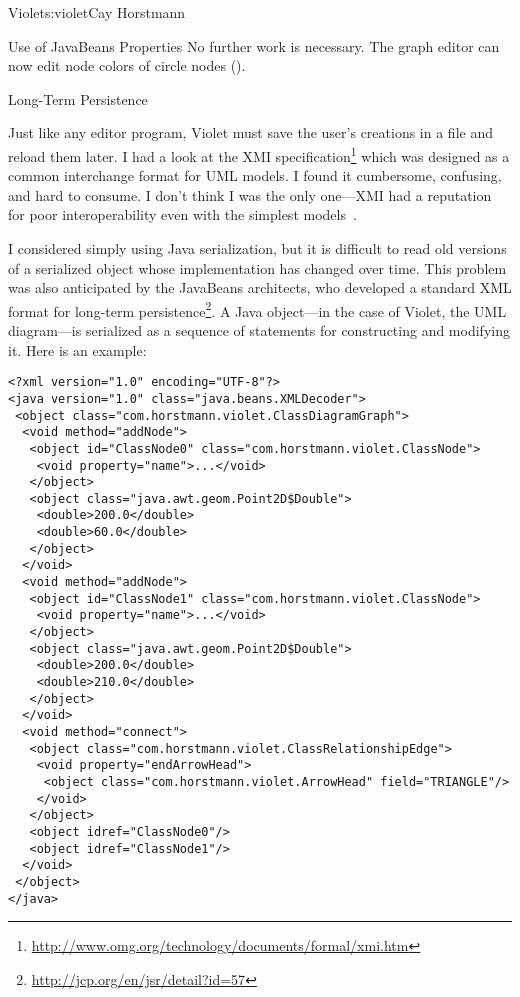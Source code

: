 \begin{aosachapter}{Violet}{s:violet}{Cay Horstmann}
\begin{aosasect1}{Use of JavaBeans Properties}
\noindent No further work is necessary. The graph editor can now edit node
colors of circle nodes ().


\end{aosasect1}

\begin{aosasect1}{Long-Term Persistence}

Just like any editor program, Violet must save the user's creations in
a file and reload them later. I had a look at the XMI
specification\footnote{\url{http://www.omg.org/technology/documents/formal/xmi.htm}}
which was designed as a common interchange format for UML models. I
found it cumbersome, confusing, and hard to consume. I don't think I
was the only one---XMI had a reputation for poor interoperability even
with the simplest models~\cite{bib:persson:osstools}.

I considered simply using Java serialization, but it is difficult to
read old versions of a serialized object whose implementation has
changed over time.  This problem was also anticipated by the JavaBeans
architects, who developed a standard XML format for long-term
persistence\footnote{\url{http://jcp.org/en/jsr/detail?id=57}}.  A
Java object---in the case of Violet, the UML diagram---is serialized
as a sequence of statements for constructing and modifying it. Here is
an example:

\begin{verbatim}
<?xml version="1.0" encoding="UTF-8"?>
<java version="1.0" class="java.beans.XMLDecoder">
 <object class="com.horstmann.violet.ClassDiagramGraph"> 
  <void method="addNode"> 
   <object id="ClassNode0" class="com.horstmann.violet.ClassNode"> 
    <void property="name">...</void> 
   </object> 
   <object class="java.awt.geom.Point2D$Double"> 
    <double>200.0</double> 
    <double>60.0</double> 
   </object> 
  </void> 
  <void method="addNode"> 
   <object id="ClassNode1" class="com.horstmann.violet.ClassNode"> 
    <void property="name">...</void> 
   </object> 
   <object class="java.awt.geom.Point2D$Double"> 
    <double>200.0</double> 
    <double>210.0</double> 
   </object> 
  </void> 
  <void method="connect"> 
   <object class="com.horstmann.violet.ClassRelationshipEdge"> 
    <void property="endArrowHead"> 
     <object class="com.horstmann.violet.ArrowHead" field="TRIANGLE"/> 
    </void> 
   </object> 
   <object idref="ClassNode0"/> 
   <object idref="ClassNode1"/> 
  </void> 
 </object> 
</java>
\end{verbatim}


\end{aosasect1}
\end{aosachapter}

